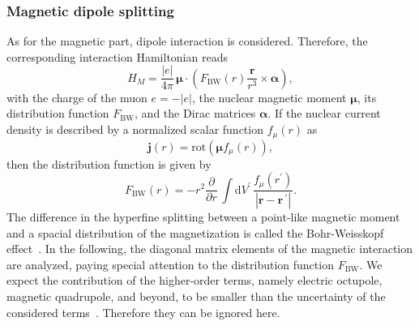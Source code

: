 \subsubsection{Magnetic dipole splitting}
\label{sec:magndip}
As for the magnetic part, dipole interaction is considered. Therefore, the corresponding interaction Hamiltonian reads~\cite{Elizarov2005}
\begin{equation}
\label{eq:Hmag}
H_{M} = \frac{|e|}{4 \pi}\,\boldsymbol{\mu}\cdot \left( F_{\text{BW}}(r) \frac{\mathbf{r}}{r^3} \times \boldsymbol{\alpha} \right),
\end{equation}
with the charge of the muon $e=-|e|$, the nuclear magnetic moment $\boldsymbol{\mu}$, its distribution function $F_{\text{BW}}$, and the Dirac matrices $\boldsymbol{\alpha}$. If the nuclear current density is described by a normalized scalar function $f_\mu(r)$ as
\begin{equation}
\label{eq:currentdistr}
\mathbf{j}(r)= \text{rot}\left(\boldsymbol{\mu}f_\mu(r)\right),
\end{equation}
then the distribution function is given by
\begin{equation}
\label{eq:Fbw}
F_{\text{BW}}(r)=-r^2 \frac{\partial}{\partial r}\,\int \text{d}V^{\prime}\,\frac{f_\mu(r^{\prime})}{|\mathbf{r}-\mathbf{r}\,^{\prime}|}.
\end{equation}
The difference in the hyperfine splitting between a point-like magnetic moment and a spacial distribution of the magnetization is called the Bohr-Weisskopf effect~\cite{bohrWeisskopf1950}. In the following, the diagonal matrix elements of the magnetic interaction are analyzed, paying special attention to the distribution function $F_{\text{BW}}$. We expect the contribution of the higher-order terms, namely electric octupole, magnetic quadrupole, and beyond, to be smaller than the uncertainty of the considered terms~\cite{Devons1995,Steffen1985}. Therefore they can be ignored here.

